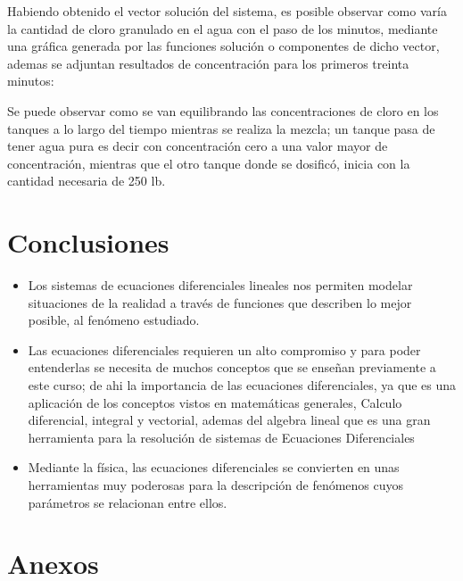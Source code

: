 \documentclass[titlepage]{article}
\begin{document}
        Habiendo obtenido el vector solución del sistema, es posible observar como varía la cantidad de cloro granulado en el agua con el paso de los minutos, mediante una gráfica generada por las funciones solución o componentes de dicho vector, ademas se adjuntan resultados de concentración para los primeros treinta minutos:
         
        
            
           
            
        Se puede observar como se van equilibrando las concentraciones de cloro en los tanques a lo largo del tiempo mientras se realiza la mezcla; un tanque pasa de tener agua pura es decir con concentración cero a una valor mayor de concentración, mientras que el otro tanque donde se dosificó, inicia con la cantidad necesaria de 250 lb.  
        
       
    \section{Conclusiones}
        
        \begin{itemize}
            \item Los sistemas de ecuaciones diferenciales lineales nos permiten modelar situaciones de la realidad a través de funciones que describen lo mejor posible, al fenómeno estudiado.
            
            \item Las ecuaciones diferenciales requieren un alto compromiso y para poder entenderlas se necesita de muchos conceptos que se enseñan previamente a este curso; de ahi la importancia de las ecuaciones diferenciales, ya que es una aplicación de los conceptos vistos en matemáticas generales, Calculo diferencial, integral y vectorial, ademas del algebra lineal que es una gran herramienta para la resolución de sistemas de Ecuaciones Diferenciales
            
            \item Mediante la física, las ecuaciones diferenciales se convierten en unas herramientas muy poderosas para la descripción de fenómenos cuyos parámetros se relacionan entre ellos.
            
        \end{itemize}
        
        \newpage
        
        
    \section{Anexos}  
\end{document}
